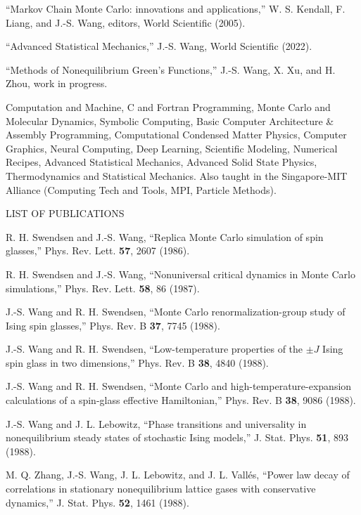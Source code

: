 \vfill\eject

\bul ``Markov Chain Monte Carlo: innovations and applications,'' W. S. Kendall,
F. Liang, and J.-S. Wang, editors, World Scientific (2005).

\bul  ``Advanced Statistical Mechanics,'' J.-S. Wang, World Scientific (2022).

\bul ``Methods of Nonequilibrium Green's Functions,''  J.-S. Wang, X. Xu, and H. Zhou,
work in progress. 



Computation and Machine, C and Fortran Programming, Monte Carlo and Molecular Dynamics, Symbolic Computing, Basic Computer Architecture \& Assembly Programming, Computational Condensed Matter Physics, Computer Graphics, Neural Computing, Deep Learning, Scientific Modeling, Numerical Recipes, Advanced Statistical Mechanics, Advanced Solid State Physics, Thermodynamics and Statistical Mechanics. Also taught in the Singapore-MIT Alliance (Computing Tech and Tools, MPI, Particle Methods).


\vfill\eject
\bigskip
\bigskip
\centerline{\heading LIST OF PUBLICATIONS} 
\bigskip 
\frenchspacing

\itm R. H. Swendsen and J.-S. Wang, ``Replica Monte Carlo
  simulation of spin glasses,'' Phys. Rev. Lett. {\bf 57}, 2607 (1986).
 
\itm R. H. Swendsen and J.-S. Wang, ``Nonuniversal critical
  dynamics in Monte Carlo simulations,'' Phys. Rev. Lett. {\bf 58}, 86
  (1987).
 
\itm J.-S. Wang and R. H. Swendsen, ``Monte Carlo 
  renormalization-group study of Ising spin glasses,'' 
  Phys. Rev. B {\bf 37}, 7745 (1988).
 
\itm J.-S. Wang and R. H. Swendsen, ``Low-temperature properties of
  the $\pm J$ Ising spin glass in two dimensions,''  Phys. Rev. B 
  {\bf 38}, 4840 (1988).
 
\itm J.-S. Wang and R. H. Swendsen, ``Monte Carlo and
  high-temperature-expansion calculations of a spin-glass effective
  Hamiltonian,'' Phys. Rev. B {\bf 38}, 9086 (1988).
 
\itm J.-S. Wang and J. L. Lebowitz, ``Phase transitions and
  universality in nonequilibrium steady states of stochastic Ising
  models,'' J. Stat. Phys. {\bf 51}, 893 (1988).
 
\itm M. Q. Zhang, J.-S. Wang, J. L. Lebowitz, and J. L. Vall\'{e}s,
  ``Power law decay of correlations in stationary nonequilibrium lattice
  gases with conservative dynamics,''  J. Stat. Phys. {\bf 52}, 1461
  (1988).
 
